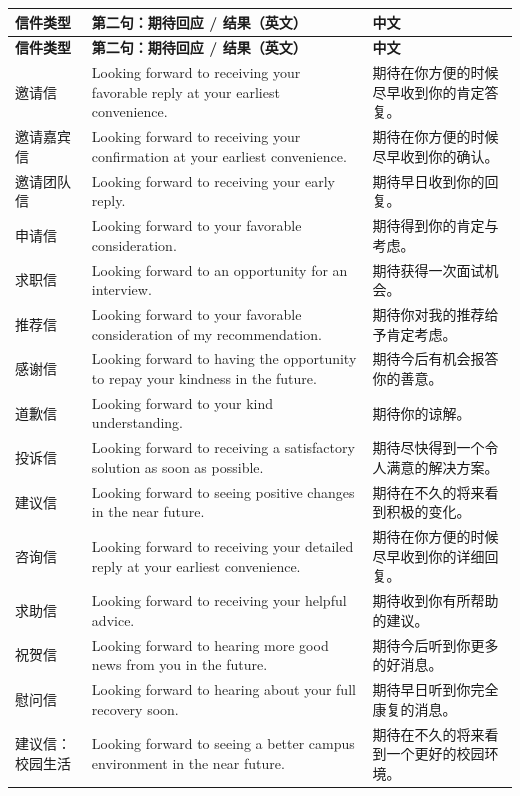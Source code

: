 \documentclass[11pt,a4paper]{ctexart}
\begin{document}
\begin{longtable}{L{2.2cm}L{9.0cm}L{4.7cm}}
\toprule
\textbf{信件类型} & \textbf{第二句：期待回应 / 结果（英文）} & \textbf{中文} \\
\midrule
\endfirsthead
\toprule
\textbf{信件类型} & \textbf{第二句：期待回应 / 结果（英文）} & \textbf{中文} \\
\midrule
\endhead
\bottomrule
\endlastfoot

邀请信 & Looking forward to receiving your favorable reply at your earliest convenience. & 期待在你方便的时候尽早收到你的肯定答复。 \\
邀请嘉宾信 & Looking forward to receiving your confirmation at your earliest convenience. & 期待在你方便的时候尽早收到你的确认。 \\
邀请团队信 & Looking forward to receiving your early reply. & 期待早日收到你的回复。 \\
申请信 & Looking forward to your favorable consideration. & 期待得到你的肯定与考虑。 \\
求职信 & Looking forward to an opportunity for an interview. & 期待获得一次面试机会。 \\
推荐信 & Looking forward to your favorable consideration of my recommendation. & 期待你对我的推荐给予肯定考虑。 \\
感谢信 & Looking forward to having the opportunity to repay your kindness in the future. & 期待今后有机会报答你的善意。 \\
道歉信 & Looking forward to your kind understanding. & 期待你的谅解。 \\
投诉信 & Looking forward to receiving a satisfactory solution as soon as possible. & 期待尽快得到一个令人满意的解决方案。 \\
建议信 & Looking forward to seeing positive changes in the near future. & 期待在不久的将来看到积极的变化。 \\
咨询信 & Looking forward to receiving your detailed reply at your earliest convenience. & 期待在你方便的时候尽早收到你的详细回复。 \\
求助信 & Looking forward to receiving your helpful advice. & 期待收到你有所帮助的建议。 \\
祝贺信 & Looking forward to hearing more good news from you in the future. & 期待今后听到你更多的好消息。 \\
慰问信 & Looking forward to hearing about your full recovery soon. & 期待早日听到你完全康复的消息。 \\
建议信：校园生活 & Looking forward to seeing a better campus environment in the near future. & 期待在不久的将来看到一个更好的校园环境。 \\

\end{longtable}
\end{document}
